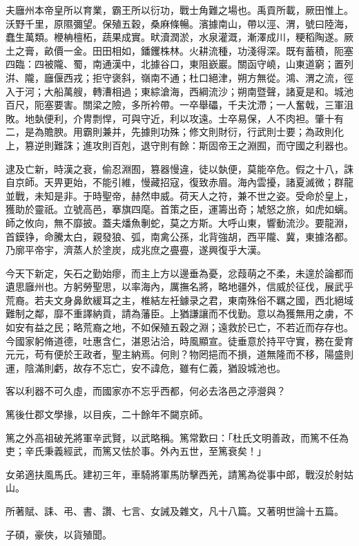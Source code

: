 \begin{pinyinscope}
夫廱州本帝皇所以育業，霸王所以衍功，戰士角難之場也。禹貢所載，厥田惟上。沃野千里，原隰彌望。保殖五穀，桑麻條暢。濱據南山，帶以涇、渭，號曰陸海，蠢生萬類。楩柟檀柘，蔬果成實。畎瀆潤淤，水泉灌溉，漸澤成川，粳稻陶遂。厥土之膏，畝價一金。田田相如，鐇钁株林。火耕流種，功淺得深。既有蓄積，阨塞四臨：四被隴、蜀，南通漢中，北據谷口，東阻嶔巖。關函守嶢，山東道窮；置列洴、隴，廱偃西戎；拒守褒斜，嶺南不通；杜口絕津，朔方無從。鴻、渭之流，徑入于河；大船萬艘，轉漕相過；東綜滄海，西綱流沙；朔南暨聲，諸夏是和。城池百尺，阨塞要害。關梁之險，多所衿帶。一卒舉礧，千夫沈滯；一人奮戟，三軍沮敗。地埶便利，介冑剽悍，可與守近，利以攻遠。士卒易保，人不肉袒。肇十有二，是為贍腴。用霸則兼并，先據則功殊；修文則財衍，行武則士要；為政則化上，篡逆則難誅；進攻則百剋，退守則有餘：斯固帝王之淵囿，而守國之利器也。

逮及亡新，時漢之衰，偷忍淵囿，篡器慢違，徒以埶便，莫能卒危。假之十八，誅自京師。天畀更始，不能引維，慢藏招寇，復致赤眉。海內雲擾，諸夏滅微；群龍並戰，未知是非。于時聖帝，赫然申威。荷天人之符，兼不世之姿。受命於皇上，獲助於靈祇。立號高邑，搴旗四麾。首策之臣，運籌出奇；虓怒之旅，如虎如螭。師之攸向，無不靡披。蓋夫燔魚剸蛇，莫之方斯。大呼山東，響動流沙。要龍淵，首鏌铮，命騰太白，親發狼、弧，南禽公孫，北背強胡，西平隴、冀，東據洛都。乃廓平帝宇，濟蒸人於塗炭，成兆庶之亹亹，遂興復乎大漢。

今天下新定，矢石之勤始瘳，而主上方以邊垂為憂，忿葭萌之不柔，未遑於論都而遺思廱州也。方躬勞聖思，以率海內，厲撫名將，略地疆外，信威於征伐，展武乎荒裔。若夫文身鼻飲緩耳之主，椎結左衽鐻录之君，東南殊俗不羈之國，西北絕域難制之鄰，靡不重譯納貢，請為藩臣。上猶謙讓而不伐勤。意以為獲無用之虜，不如安有益之民；略荒裔之地，不如保殖五穀之淵；遠救於已亡，不若近而存存也。今國家躬脩道德，吐惠含仁，湛恩沾洽，時風顯宣。徒垂意於持平守實，務在愛育元元，苟有便於王政者，聖主納焉。何則？物罔挹而不損，道無隆而不移，陽盛則運，陰滿則虧，故存不忘亡，安不諱危，雖有仁義，猶設城池也。

客以利器不可久虛，而國家亦不忘乎西都，何必去洛邑之渟瀯與？

篤後仕郡文學掾，以目疾，二十餘年不闚京師。

篤之外高祖破羌將軍辛武賢，以武略稱。篤常歎曰：「杜氏文明善政，而篤不任為吏；辛氏秉義經武，而篤又怯於事。外內五世，至篤衰矣！」

女弟適扶風馬氏。建初三年，車騎將軍馬防擊西羌，請篤為從事中郎，戰沒於射姑山。

所著賦、誄、弔、書、讚、七言、女誡及雜文，凡十八篇。又著明世論十五篇。

子碩，豪俠，以貨殖聞。


\end{pinyinscope}
